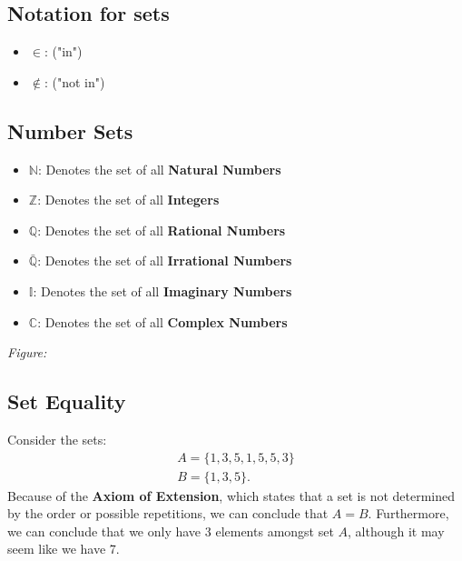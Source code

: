 \documentclass{report}
\begin{document}
        \subsection{Notation for sets}
        \bigbreak \noindent 
        \begin{itemize}
          \item $\in$: ("in")
          \item $\notin$: ("not in")
        \end{itemize}
        \bigbreak \noindent \bigbreak \noindent 
        \subsection{Number Sets}
        \bigbreak \noindent 
            \begin{itemize}
        \item $\mathbb{N}$: Denotes the set of all \textbf{Natural Numbers}
        \item $\mathbb{Z}$: Denotes the set of all \textbf{Integers}
        \item $\mathbb{Q}$: Denotes the set of all \textbf{Rational Numbers}
        \item $\mathbb{\bar{Q}}$: Denotes the set of all \textbf{Irrational Numbers}
        \item $\mathbb{I}$: Denotes the set of all \textbf{Imaginary Numbers}
        \item $\mathbb{C}$: Denotes the set of all \textbf{Complex Numbers}
    \end{itemize}
    \bigbreak \noindent 
    \textit{Figure:}
  \begin{figure}[ht]
      \centering
      \label{fig:fig12}
  \end{figure}
  \bigbreak \noindent \bigbreak \noindent 
  \subsection{Set Equality}
  \bigbreak \noindent 
      Consider the sets:
    \begin{align*}
        A = \{1,3,5,1,5,5,3\} \\
        B = \{1,3,5\}
    .\end{align*}
    \bigbreak \noindent 
    Because of the \textbf{Axiom of Extension}, which states that a set is not determined by the order or possible repetitions, we can conclude that $A=B$.
    \bigbreak \noindent 
    Furthermore, we can conclude that we only have $3$ elements amongst set $A$, although it may seem like we have 7.
\end{document}
